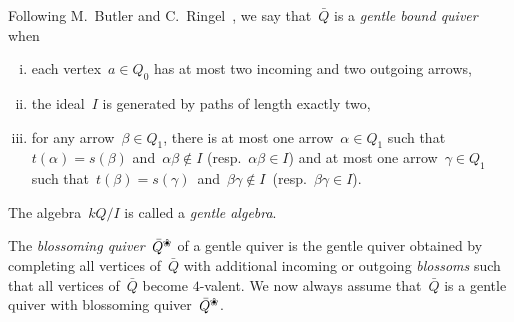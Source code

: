 \documentclass{amsart}
\theoremstyle{definition}
\newcommand{\ssm}{\smallsetminus} %
\newcommand{\darkblue}{\color{darkblue}} %
\newcommand{\defn}[1]{\textsl{\darkblue #1}} %
\newcommand{\quiver}{\bar Q} %
\newcommand{\blossom}{^\text{\ding{96}}} %
\begin{document}
Following M.~Butler and C.~Ringel~\cite{ButlerRingel}, we say that~$\quiver$ is a \defn{gentle bound quiver} when
\begin{enumerate}[(i)]
\item each vertex~$a \in Q_0$ has at most two incoming and two outgoing arrows,
\item the ideal~$I$ is generated by paths of length exactly two,
\item for any arrow~$\beta \in Q_1$, there is at most one arrow~$\alpha \in Q_1$ such that~$t(\alpha) = s(\beta)$ and~${\alpha\beta\notin I}$ (resp.~$\alpha\beta \in I$) and at most one arrow~$\gamma \in Q_1$ such that~$t(\beta) = s(\gamma)$~and~${\beta\gamma\notin I}$~(resp.~${\beta\gamma \in I}$).
\end{enumerate}
The algebra~$kQ/I$ is called a \defn{gentle algebra}.

The \defn{blossoming quiver}~$\quiver\blossom$ of a gentle quiver is the gentle quiver obtained by completing all vertices of~$\quiver$ with additional incoming or outgoing \defn{blossoms} such that all vertices of~$\quiver$ become $4$-valent.
%
%
We now always assume that~$\quiver$ is a gentle quiver with blossoming quiver~$\quiver\blossom$.
\end{document}
